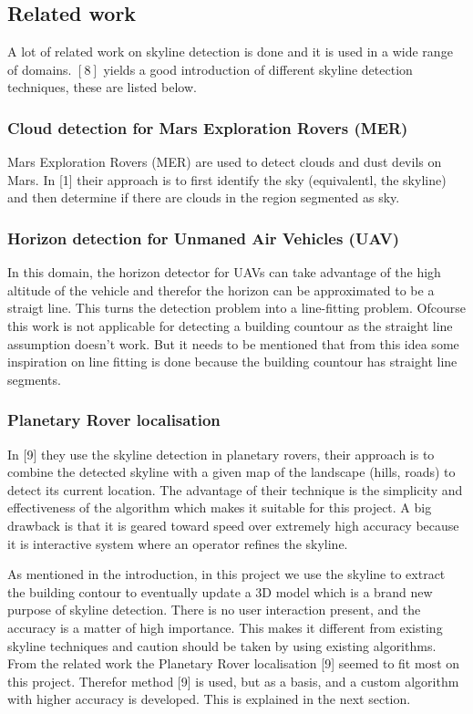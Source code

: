 \documentclass[10pt]{article}
\begin{document}
 \subsection{Related work}
A lot of related work on skyline detection is done and it is used in a wide
range of domains. $[8]$ yields a good introduction of different skyline
detection techniques, these are listed below.

\subsubsection{Cloud detection for Mars Exploration Rovers (MER)}
Mars Exploration Rovers (MER) are used to detect clouds and dust devils on Mars.
In [1] their approach is to first identify the sky (equivalentl, the skyline)
and then determine if there are clouds in the region segmented as sky.

\subsubsection{Horizon detection for Unmaned Air Vehicles (UAV)}
In this domain, the horizon detector for UAVs can take advantage of the high
altitude of the vehicle and therefor the horizon can be approximated to be a
straigt line.  This turns the detection problem into a line-fitting problem.
Ofcourse this work is not applicable for detecting a building countour as the
straight line assumption doesn't work. But it needs to be mentioned that from this
idea some inspiration on line fitting is done because the building countour has
straight line segments.

\subsubsection{Planetary Rover localisation}
In [9] they use the skyline detection in planetary rovers, their approach is to
combine the detected skyline with a given map of the landscape (hills, roads) to
detect its current location. 
The advantage of their technique is the simplicity and effectiveness of the
algorithm which makes it suitable for this project.  A big drawback is that it
is geared toward speed over extremely high accuracy because it is 
interactive system where an operator refines the skyline.

As mentioned in the introduction, in this project we use the skyline to extract
the building contour to eventually update a 3D model which is a brand new
purpose of skyline detection.  There is no user interaction present, and the
accuracy is a matter of high importance.  This makes it different from existing
skyline techniques and caution should be taken by using existing algorithms.
From the related work the Planetary Rover localisation [9] seemed to fit most on
this project.  Therefor method [9] is used, but as a basis, and a custom
algorithm with higher accuracy is developed. This is explained in the next
section.
\end{document}
